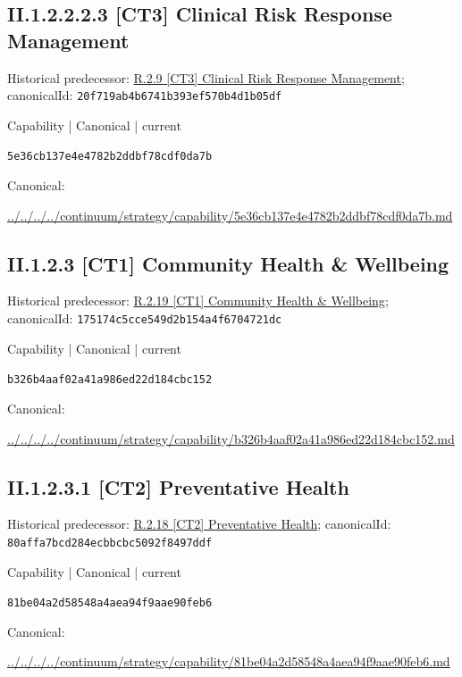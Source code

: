 \documentclass[10pt,a4paper]{article}
\begin{document}
\subsection*{II.1.2.2.2.3 [CT3] Clinical Risk Response Management}
Historical predecessor: \hyperref[element-20f719ab4b6741b393ef570b4d1b05df]{R.2.9 [CT3] Clinical Risk Response Management}; canonicalId: \texttt{20f719ab4b6741b393ef570b4d1b05df}\par
\label{element-5e36cb137e4e4782b2ddbf78cdf0da7b}
{\small Capability | Canonical | current}\par
\texttt{5e36cb137e4e4782b2ddbf78cdf0da7b}\par
Canonical: \par
{\footnotesize\url{../../../../continuum/strategy/capability/5e36cb137e4e4782b2ddbf78cdf0da7b.md}}\par
\subsection*{II.1.2.3 [CT1] Community Health \& Wellbeing}
Historical predecessor: \hyperref[element-175174c5cce549d2b154a4f6704721dc]{R.2.19 [CT1] Community Health \& Wellbeing}; canonicalId: \texttt{175174c5cce549d2b154a4f6704721dc}\par
\label{element-b326b4aaf02a41a986ed22d184cbc152}
{\small Capability | Canonical | current}\par
\texttt{b326b4aaf02a41a986ed22d184cbc152}\par
Canonical: \par
{\footnotesize\url{../../../../continuum/strategy/capability/b326b4aaf02a41a986ed22d184cbc152.md}}\par
\subsection*{II.1.2.3.1 [CT2] Preventative Health}
Historical predecessor: \hyperref[element-80affa7bcd284ecbbcbc5092f8497ddf]{R.2.18 [CT2] Preventative Health}; canonicalId: \texttt{80affa7bcd284ecbbcbc5092f8497ddf}\par
\label{element-81be04a2d58548a4aea94f9aae90feb6}
{\small Capability | Canonical | current}\par
\texttt{81be04a2d58548a4aea94f9aae90feb6}\par
Canonical: \par
{\footnotesize\url{../../../../continuum/strategy/capability/81be04a2d58548a4aea94f9aae90feb6.md}}\par
\end{document}
